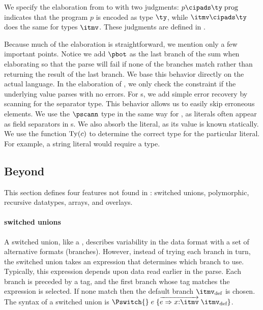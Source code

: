We specify the elaboration from \ipads{} to \ddc{} with two judgments:
 $p \cipads \ty\; \text{prog}$ indicates that the \ipads{} program
$p$ is encoded as \ddc{} type $\ty$, while $\itmv \cipads \ty$
does the same for \ipads{} types $\itmv$. These judgments are defined
in .

Because much of the elaboration is straightforward, we mention only a few
important points. Notice we add $\pbot$ as the
last branch of the \ddc{} sum when elaborating \Punion{} so that the
parse will fail if none of the branches match rather than returning
the result of the last branch. We base this behavior
  directly on the actual \padsc{} language. In the elaboration of
\Pwhere{}, we only check the constraint if the underlying value parses
with no errors. For \Parray{}s, we add simple error recovery by
scanning for the separator type.  This behavior allows us to easily
skip erroneous elements. We use the $\pscann$ type in the same way for
, as literals often appear as field separators in
\Pstruct{}s.  We also absorb the literal, as its value is known
statically.  We use the function ${\rm Ty}(c)$ to determine the
correct type for the particular literal. For example, a string
literal would require a \Pstring{} type.

\subsection{Beyond \ipads{}}

This section defines four features not found in \ipads{}: \padsc{}
switched unions, \padsml{} polymorphic, recursive datatypes,
\datascript{} arrays, and \packettypes{} overlays.

\paragraph*{\padsc{} switched unions}
A switched union, like a \Punion, describes variability in the data
format with a set of alternative formats (branches). However, instead
of trying each branch in turn, the switched union takes an expression that
determines which branch to use. Typically, this expression depends upon data read earlier in the parse. Each branch is preceded by a tag,
and the first branch whose tag matches the expression is selected.
If none match then the default branch $\itmv_{\text{def}}$ is chosen.
The syntax of a switched union is $\Pswitch{}\;e\;\{\overrightarrow{e
  \Rightarrow x{:}\itmv}\; \itmv_{\text{def}}\}$.

